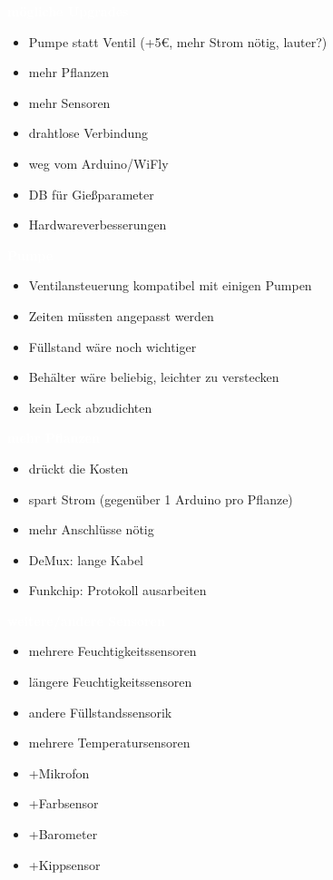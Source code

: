 \documentclass[bigger]{beamer}
\newcommand{\topic}[1]{{\huge{\textcolor{white}{\textbf{#1}}}}}
\begin{document}
\begin{frame}{\topic{mögliche Upgrades}}
	\begin{itemize}
		\item Pumpe statt Ventil (+{5\euro}, mehr Strom nötig, lauter?)
		\item mehr Pflanzen
		\item mehr Sensoren
		\item drahtlose Verbindung
		\item weg vom Arduino/WiFly
		\item DB für Gießparameter
		\item Hardwareverbesserungen
	\end{itemize}
\end{frame}

\begin{frame}{\topic{Pumpe}}
	\begin{itemize}
		\item Ventilansteuerung kompatibel mit einigen Pumpen
		\item Zeiten müssten angepasst werden
		\item Füllstand wäre noch wichtiger
		\item Behälter wäre beliebig, leichter zu verstecken
		\item kein Leck abzudichten
	\end{itemize}
\end{frame}

\begin{frame}{\topic{mehr Pflanzen}}
	\begin{itemize}
		\item drückt die Kosten
		\item spart Strom (gegenüber 1 Arduino pro Pflanze)
		\item mehr Anschlüsse nötig
		\item DeMux: lange Kabel
		\item Funkchip: Protokoll ausarbeiten
	\end{itemize}
\end{frame}

\begin{frame}{\topic{weitere/andere Sensoren}}
	\begin{itemize}
		\item mehrere Feuchtigkeitssensoren
		\item längere Feuchtigkeitssensoren
		\item andere Füllstandssensorik
		\item mehrere Temperatursensoren
		\item +Mikrofon
		\item +Farbsensor
		\item +Barometer
		\item +Kippsensor
	\end{itemize}
\end{frame}
\end{document}
